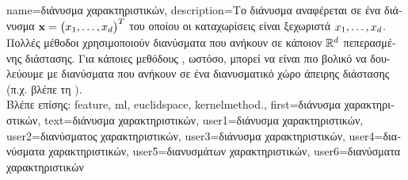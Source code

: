 {name={\foreignlanguage{greek}{διάνυσμα χαρακτηριστικών}},
	description={\foreignlanguage{greek}{Το διάνυσμα} 
		 \foreignlanguage{greek}{αναφέρεται σε ένα διάνυσμα ${\bf x} = \big(x_{1}, \ldots, x_{d}\big)^{T}$ 
		του οποίου οι καταχωρίσεις είναι ξεχωριστά}  $x_{1}, \ldots, x_{d}$. 
		\foreignlanguage{greek}{Πολλές μέθοδοι}  \foreignlanguage{greek}{χρησιμοποιούν διανύσματα} 
		 \foreignlanguage{greek}{που ανήκουν σε κάποιον}  $\mathbb{R}^{d}$
		\foreignlanguage{greek}{πεπερασμένης διάστασης. Για κάποιες μεθόδους} 
		, \foreignlanguage{greek}{ωστόσο, μπορεί να είναι πιο βολικό να δουλεύουμε με διανύσματα}  
		\foreignlanguage{greek}{που ανήκουν σε ένα διανυσματικό χώρο άπειρης διάστασης (π.χ. βλέπε τη} ).\\
		\foreignlanguage{greek}{Βλέπε επίσης:} \gls{feature}, \gls{ml}, \gls{euclidspace}, \gls{kernelmethod}.}, 
	first={\foreignlanguage{greek}{διάνυσμα χαρακτηριστικών}},
	text={\foreignlanguage{greek}{διάνυσμα χαρακτηριστικών}},
	user1={\foreignlanguage{greek}{διάνυσμα χαρακτηριστικών}}, %
  	user2={\foreignlanguage{greek}{διανύσματος χαρακτηριστικών}}, %
	user3={\foreignlanguage{greek}{διάνυσμα χαρακτηριστικών}}, %
	user4={\foreignlanguage{greek}{διανύσματα χαρακτηριστικών}}, %
  	user5={\foreignlanguage{greek}{διανυσμάτων χαρακτηριστικών}}, %
	user6={\foreignlanguage{greek}{διανύσματα χαρακτηριστικών}} %
}


